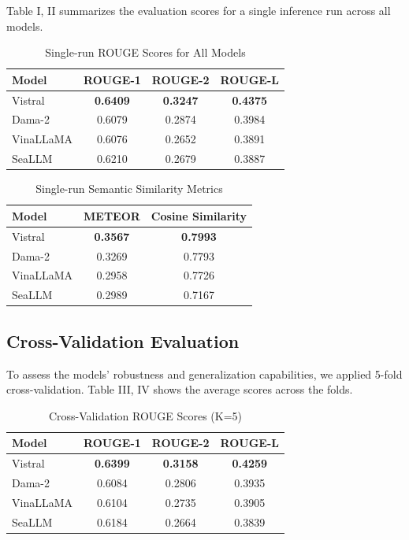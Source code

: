 \documentclass[conference]{IEEEtran}
\begin{document}
Table I, II summarizes the evaluation scores for a single inference run across all models.

\begin{table}[H]
\centering
\caption{Single-run ROUGE Scores for All Models}
\label{tab:rouge-single-run}
\begin{tabular}{|l|c|c|c|}
\hline
\textbf{Model} & \textbf{ROUGE-1} & \textbf{ROUGE-2} & \textbf{ROUGE-L} \\
\hline
Vistral       & \textbf{0.6409} & \textbf{0.3247} & \textbf{0.4375} \\
Dama-2        & 0.6079          & 0.2874          & 0.3984          \\
VinaLLaMA     & 0.6076          & 0.2652          & 0.3891          \\
SeaLLM        & 0.6210          & 0.2679          & 0.3887          \\
\hline
\end{tabular}
\end{table} 

\begin{table}[H]
\centering
\caption{Single-run Semantic Similarity Metrics}
\label{tab:semantic-single-run}
\begin{tabular}{|l|c|c|}
\hline
\textbf{Model} & \textbf{METEOR} & \textbf{Cosine Similarity} \\
\hline
Vistral       & \textbf{0.3567} & \textbf{0.7993} \\
Dama-2        & 0.3269          & 0.7793          \\
VinaLLaMA     & 0.2958          & 0.7726          \\
SeaLLM        & 0.2989          & 0.7167          \\
\hline
\end{tabular}
\end{table}

\subsection{Cross-Validation Evaluation}

To assess the models' robustness and generalization capabilities, we applied 5-fold cross-validation. Table III, IV shows the average scores across the folds.

\begin{table}[H]
\centering
\caption{Cross-Validation ROUGE Scores (K=5)}
\label{tab:cv-rouge}
\begin{tabular}{|l|c|c|c|}
\hline
\textbf{Model} & \textbf{ROUGE-1} & \textbf{ROUGE-2} & \textbf{ROUGE-L} \\
\hline
Vistral    & \textbf{0.6399} & \textbf{0.3158} & \textbf{0.4259} \\
Dama-2     & 0.6084 & 0.2806 & 0.3935 \\
VinaLLaMA  & 0.6104 & 0.2735 & 0.3905 \\
SeaLLM     & 0.6184 & 0.2664 & 0.3839 \\
\hline
\end{tabular}
\end{table}
\end{document}
